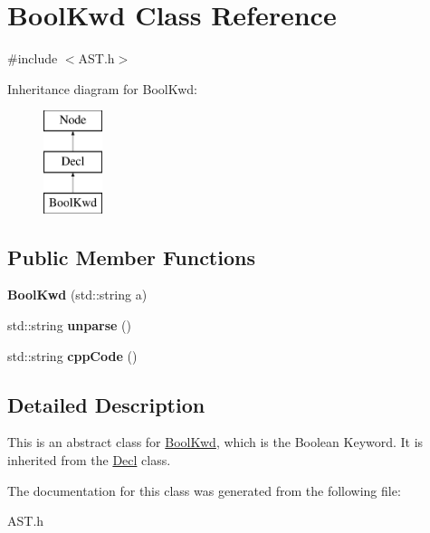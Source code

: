\hypertarget{class_bool_kwd}{}\section{Bool\+Kwd Class Reference}
\label{class_bool_kwd}


{\ttfamily \#include $<$A\+S\+T.\+h$>$}

Inheritance diagram for Bool\+Kwd\+:\begin{figure}[H]
\begin{center}
\leavevmode
\includegraphics[height=3.000000cm]{class_bool_kwd}
\end{center}
\end{figure}
\subsection*{Public Member Functions}
\begin{DoxyCompactItemize}
\item 
\hypertarget{class_bool_kwd_a7a5b8a6d6b3eb77bf2298fed48dd7643}{}{\bfseries Bool\+Kwd} (std\+::string a)\label{class_bool_kwd_a7a5b8a6d6b3eb77bf2298fed48dd7643}

\item 
\hypertarget{class_bool_kwd_a510d283e9ae18938449674a1022a2346}{}std\+::string {\bfseries unparse} ()\label{class_bool_kwd_a510d283e9ae18938449674a1022a2346}

\item 
\hypertarget{class_bool_kwd_a4e6da303d04b4a5468aec0c142917a58}{}std\+::string {\bfseries cpp\+Code} ()\label{class_bool_kwd_a4e6da303d04b4a5468aec0c142917a58}

\end{DoxyCompactItemize}


\subsection{Detailed Description}
This is an abstract class for \hyperlink{class_bool_kwd}{Bool\+Kwd}, which is the Boolean Keyword. It is inherited from the \hyperlink{class_decl}{Decl} class. 

The documentation for this class was generated from the following file\+:\begin{DoxyCompactItemize}
\item 
A\+S\+T.\+h\end{DoxyCompactItemize}
